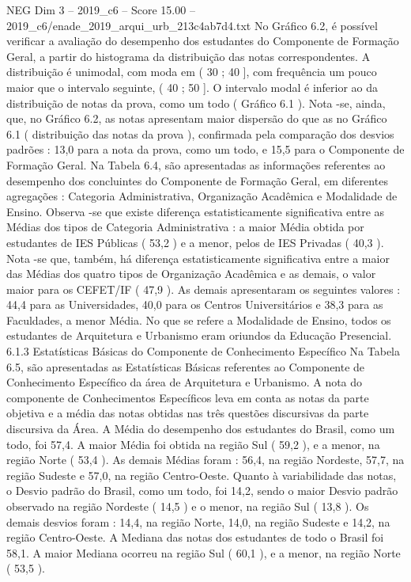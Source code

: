 \begin{textsample}{NEG Dim 3 – 2019\_c6 – Score 15.00 – 2019\_c6/enade\_2019\_arqui\_urb\_213c4ab7d4.txt}
No Gráfico 6.2, é possível verificar a avaliação do desempenho dos estudantes do Componente de Formação Geral, a partir do histograma da distribuição das notas correspondentes.
A distribuição é unimodal, com moda em ( 30 ; 40 ], com frequência um pouco maior que o intervalo seguinte, ( 40 ; 50 ].
O intervalo modal é inferior ao da distribuição de notas da prova, como um todo ( Gráfico 6.1 ).
Nota -se, ainda, que, no Gráfico 6.2, as notas apresentam maior dispersão do que as no Gráfico 6.1 ( distribuição das notas da prova ), confirmada pela comparação dos desvios padrões : 13,0 para a nota da prova, como um todo, e 15,5 para o Componente de Formação Geral.
Na Tabela 6.4, são apresentadas as informações referentes ao desempenho dos concluintes do Componente de Formação Geral, em diferentes agregações : Categoria Administrativa, Organização Acadêmica e Modalidade de Ensino.
Observa -se que existe diferença estatisticamente significativa entre as Médias dos tipos de Categoria Administrativa : a maior Média obtida por estudantes de IES Públicas ( 53,2 ) e a menor, pelos de IES Privadas ( 40,3 ).
Nota -se que, também, há diferença estatisticamente significativa entre a maior das Médias dos quatro tipos de Organização Acadêmica e as demais, o valor maior para os CEFET/IF ( 47,9 ).
As demais apresentaram os seguintes valores : 44,4 para as Universidades, 40,0 para os Centros Universitários e 38,3 para as Faculdades, a menor Média.
No que se refere a Modalidade de Ensino, todos os estudantes de Arquitetura e Urbanismo eram oriundos da Educação Presencial. 6.1.3 Estatísticas Básicas do Componente de Conhecimento Específico Na Tabela 6.5, são apresentadas as Estatísticas Básicas referentes ao Componente de Conhecimento Específico da área de Arquitetura e Urbanismo.
A nota do componente de Conhecimentos Específicos leva em conta as notas da parte objetiva e a média das notas obtidas nas três questões discursivas da parte discursiva da Área.
A Média do desempenho dos estudantes do Brasil, como um todo, foi 57,4.
A maior Média foi obtida na região Sul ( 59,2 ), e a menor, na região Norte ( 53,4 ).
As demais Médias foram : 56,4, na região Nordeste, 57,7, na região Sudeste e 57,0, na região Centro-Oeste.
Quanto à variabilidade das notas, o Desvio padrão do Brasil, como um todo, foi 14,2, sendo o maior Desvio padrão observado na região Nordeste ( 14,5 ) e o menor, na região Sul ( 13,8 ).
Os demais desvios foram : 14,4, na região Norte, 14,0, na região Sudeste e 14,2, na região Centro-Oeste.
A Mediana das notas dos estudantes de todo o Brasil foi 58,1.
A maior Mediana ocorreu na região Sul ( 60,1 ), e a menor, na região Norte ( 53,5 ).

\end{textsample}
